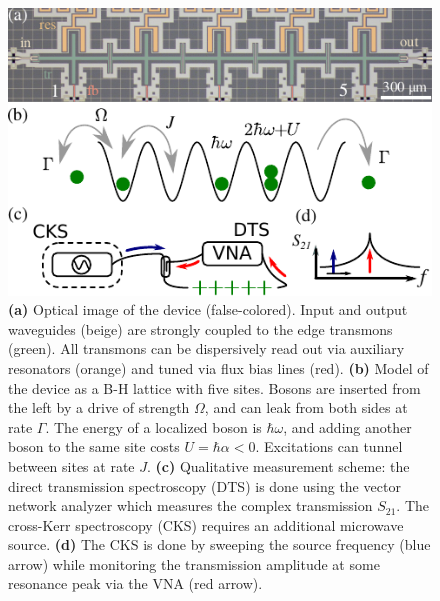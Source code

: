 \documentclass[%
 aps, prl,
 amsmath,amssymb,
 reprint,%
superscriptaddress
]{revtex4-2}
\begin{document}
\begin{figure}
	\centering
	\includegraphics[width=1\linewidth]{Pictures/scheme.pdf}
	\caption{\textbf{(a)} Optical image of the device (false-colored). Input and output waveguides (beige) are strongly coupled to the edge transmons (green). All transmons can be dispersively read out via auxiliary resonators (orange) and tuned via flux bias lines (red). \textbf{(b)} Model of the device as a B-H lattice with five sites. Bosons are inserted from the left by a drive of strength $\Omega$, and can leak from both sides at rate $\Gamma$. The energy of a localized boson is $\hbar \omega$, and adding another boson to the same site costs $U = \hbar \alpha < 0$. Excitations can tunnel between sites at rate $J$. \textbf{(c)} Qualitative measurement scheme: the direct transmission spectroscopy (DTS) is done using the vector network analyzer which measures the complex transmission $ S_{21} $. The cross-Kerr spectroscopy (CKS) requires an additional microwave source. \textbf{(d)} The CKS is done by sweeping the source frequency (blue arrow) while monitoring the transmission amplitude at some resonance peak via the VNA (red arrow).}
	\label{fig:scheme}
\end{figure}
	
\end{document}
